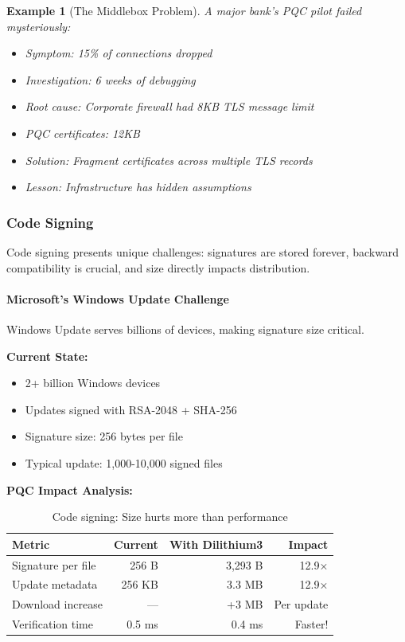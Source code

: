 \documentclass[11pt,a4paper]{article}
\newtheorem{example}{Example}
\begin{document}
\begin{example}[The Middlebox Problem]
A major bank's PQC pilot failed mysteriously:
\begin{itemize}
    \item Symptom: 15\% of connections dropped
    \item Investigation: 6 weeks of debugging
    \item Root cause: Corporate firewall had 8KB TLS message limit
    \item PQC certificates: 12KB
    \item Solution: Fragment certificates across multiple TLS records
    \item Lesson: Infrastructure has hidden assumptions
\end{itemize}
\end{example}

\subsubsection{Code Signing}

Code signing presents unique challenges: signatures are stored forever, backward compatibility is crucial, and size directly impacts distribution.

\paragraph{Microsoft's Windows Update Challenge}

Windows Update serves billions of devices, making signature size critical.

\textbf{Current State:}
\begin{itemize}
    \item 2+ billion Windows devices
    \item Updates signed with RSA-2048 + SHA-256
    \item Signature size: 256 bytes per file
    \item Typical update: 1,000-10,000 signed files
\end{itemize}

\textbf{PQC Impact Analysis:}
\begin{table}[h]
\centering
\begin{tabular}{|l|r|r|r|}
\hline
\textbf{Metric} & \textbf{Current} & \textbf{With Dilithium3} & \textbf{Impact} \\
\hline
Signature per file & 256 B & 3,293 B & 12.9× \\
Update metadata & 256 KB & 3.3 MB & 12.9× \\
Download increase & — & +3 MB & Per update \\
Verification time & 0.5 ms & 0.4 ms & Faster! \\
\hline
\end{tabular}
\caption{Code signing: Size hurts more than performance}
\end{table}
\end{document}
